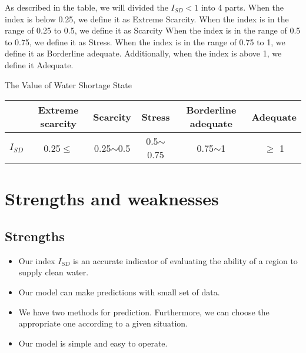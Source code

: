 \documentclass{mcmthesis}
\begin{document}
\par As described in the table, we will divided the $I_{SD} < 1$ into 4 parts. When the index is below 0.25, we define it as Extreme Scarcity. When the index is in the range of 0.25 to 0.5, we define it as Scarcity When the index is in the range of 0.5 to 0.75, we define it as Stress. When the index is in the range of 0.75 to 1, we define it as Borderline adequate. Additionally, when the index is above 1, we define it Adequate.
	\begin{center}
	The Value of Water Shortage State\\
	\begin{tabular}{lccccc}
	\toprule 
	 & Extreme scarcity & Scarcity & Stress & Borderline adequate & Adequate\\
	\midrule
	$I_{SD}$ & 0.25$\leq$ & 0.25$\sim$0.5 & 0.5$\sim$0.75 & 0.75$\sim$1 & $\geq$ 1 \\
	\bottomrule
	\end{tabular}
	\end{center}



\section{Strengths and weaknesses}


\subsection{Strengths}
\begin{itemize}
\item Our index $I_{SD}$ is an accurate indicator of evaluating the ability of a region to supply clean water.
\item Our model can make predictions with small set of data.
\item We have two methods for prediction. Furthermore, we can choose the appropriate one according to a given situation.
\item Our model is simple and easy to operate.
\end{itemize}
\end{document}
